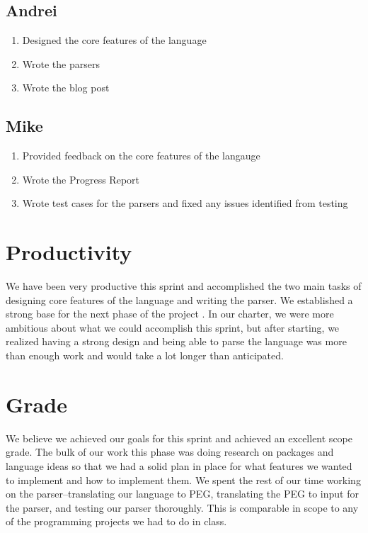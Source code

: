 \documentclass{article}
\begin{document}
\subsection*{Andrei}
\begin{enumerate}
	\item Designed the core features of the language
	\item Wrote the parsers
	\item Wrote the blog post
\end{enumerate}

\subsection*{Mike}
\begin{enumerate}
	\item Provided feedback on the core features of the langauge
	\item Wrote the Progress Report
	\item Wrote test cases for the parsers and fixed any issues identified from 
	      testing
\end{enumerate}

\section*{Productivity}
We have been very productive this sprint and
accomplished the two main tasks of designing core features of the language
and writing the parser. We established a strong base for the next phase of the project
. In our charter, we were more ambitious about what we could accomplish this sprint,
but after starting, we realized having a strong design and being able to parse the
language was more than enough work and would take a lot longer than anticipated.

\section*{Grade}

We believe we achieved our goals for this sprint and achieved an excellent scope
grade. The bulk of our work this phase was doing research on packages and language
ideas so that we had a solid plan in place for what features we wanted to implement
and how to implement them. We spent the rest of our time working on the 
parser--translating our language to PEG, translating the PEG to input for the parser, and testing our parser thoroughly. 
This is comparable in scope to any of the programming
projects we had to do in class. 
\end{document}
